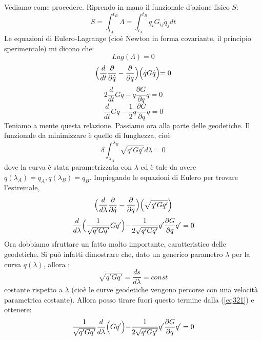 \documentclass[a4paper,openany]{article}
\begin{document}
	Vediamo come procedere. Riprendo in mano il funzionale d'azione fisico $S$:
	$$ 
	S = \int_{t_A}^{t_B}\Lambda = \int_{t_A}^{t_B}\dot{q}_iG_{ij}\dot{q}_j dt
	$$
	Le equazioni di Eulero-Lagrange (cioè Newton in forma covariante, il principio sperimentale) mi dicono che:
	\begin{equation}\label{key}
		Lag(\Lambda) = 0
	\end{equation}
	\begin{equation}\label{key}
		\Bigl(\dfrac{d}{dt}\dfrac{\partial}{\partial \dot{q}}-\dfrac{\partial}{\partial q}\Bigl)\Bigl(\dot{q}G\dot{q}\Bigl) = 0
	\end{equation}
	\begin{equation}\label{eq123}
		2\dfrac{d}{dt}G\dot{q}-\dot{q}\dfrac{\partial G}{\partial q}\dot{q} =0
	\end{equation}
	\begin{equation}\label{eq124}
		\dfrac{d}{dt}G\dot{q}-\dfrac{1}{2}\dot{q}\dfrac{\partial G}{\partial q}\dot{q} =0
	\end{equation}
	Teniamo a mente questa relazione. Passiamo ora alla parte delle geodetiche. Il funzionale da minimizzare è quello di lunghezza, cioè
	$$
	\delta \int_{\lambda_A}^{\lambda_B}\sqrt{q'Gq'}d\lambda  = 0
	$$
	dove la curva è stata parametrizzata con $\lambda$ ed è tale da avere $q(\lambda_A) = q_A, q(\lambda_B) = q_B$. Impiegando le equazioni di Eulero per trovare l'estremale,
	\begin{equation}\label{key}
		\Bigl(\dfrac{d}{d\lambda}\dfrac{\partial}{\partial \dot{q}}-\dfrac{\partial}{\partial q}\Bigl)\Bigl(\sqrt{q'Gq'}\Bigl)
	\end{equation}
	\begin{equation}\label{eq321}
		\dfrac{d}{d\lambda}\Bigl(\dfrac{1}{\sqrt{q'Gq'}}Gq'\Bigl)-\dfrac{1}{2\sqrt{q'Gq'}}q'\dfrac{\partial G}{\partial q}q' =0
	\end{equation}
	Ora dobbiamo sfruttare un fatto molto importante, caratteristico delle geodetiche. Si può infatti dimostrare che, dato un generico parametro $\lambda$ per la curva $q(\lambda)$, allora :
	$$
	\sqrt{q'Gq'} = \dfrac{ds}{d\lambda} = const
	$$
	costante rispetto a $\lambda$ (cioè le curve geodetiche vengono percorse con una velocità parametrica costante). Allora posso tirare fuori questo termine dalla (\ref{eq321}) e ottenere:
	\begin{equation}\label{key}
		\dfrac{1}{\sqrt{q'Gq'}}\dfrac{d}{d\lambda}\Bigl(Gq'\Bigl)-\dfrac{1}{2\sqrt{q'Gq'}}q'\dfrac{\partial G}{\partial q}q' =0
	\end{equation}
\end{document}
